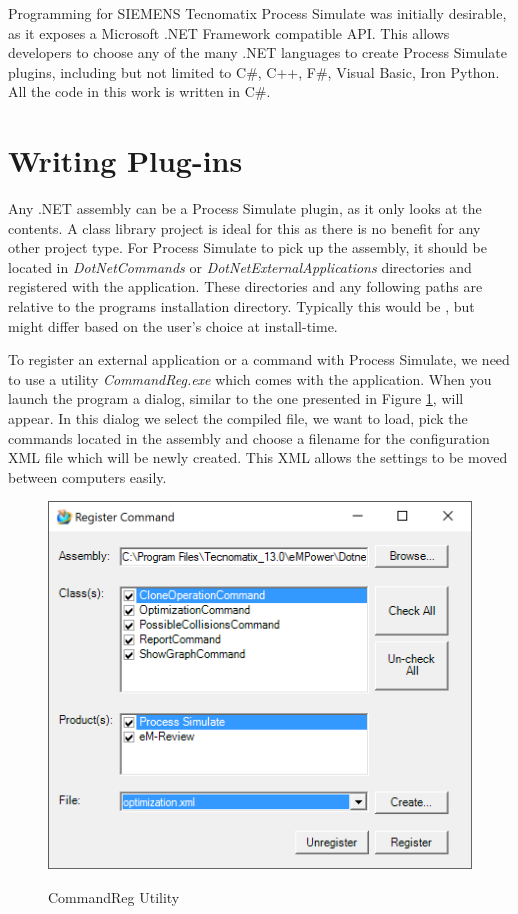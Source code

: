 Programming for SIEMENS Tecnomatix Process Simulate was initially desirable, as it exposes a Microsoft .NET Framework compatible API. This allows developers to choose any of the many .NET languages to create Process Simulate plugins, including but not limited to C\#, C++, F\#, Visual Basic, Iron Python. All the code in this work is written in C\#.

\section{Writing Plug-ins}
Any .NET assembly can be a Process Simulate plugin, as it only looks at the contents. 
A class library project is ideal for this as there is no benefit for any other project type. 
For Process Simulate to pick up the assembly, it should be located in \emph{DotNetCommands} or \emph{DotNetExternalApplications} directories and registered with the application. 
These directories and any following paths are relative to the programs installation directory. 
Typically this would be , but might differ based on the user's choice at install-time.

To register an external application or a command with Process Simulate, we need to use a utility \emph{CommandReg.exe} which comes with the application. When you launch the program a dialog, similar to the one presented in Figure \ref{fig:CommandReg}, will appear. In this dialog we select the compiled file, we want to load, pick the commands located in the assembly and choose a filename for the configuration XML file which will be newly created. This XML allows the settings to be moved between computers easily. \\

\begin{figure}[H]
    \caption{CommandReg Utility}
    \centering
    \includegraphics{commandreg}
    \label{fig:CommandReg}
\end{figure}

